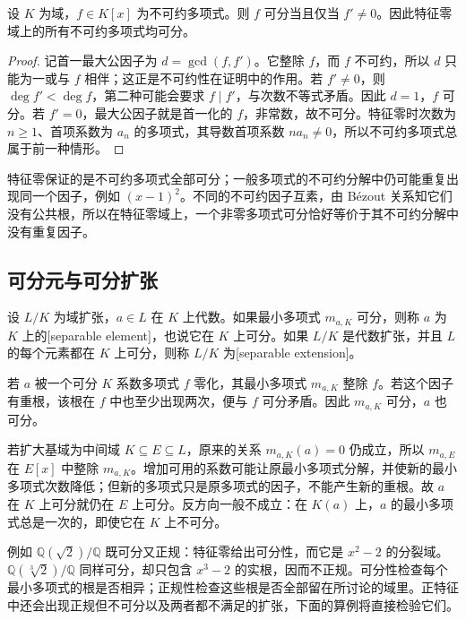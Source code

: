 \begin{proposition}\label{b1:prop:irreducible-separable-derivative}
	设 \(K\) 为域，\(f\in K[x]\) 为不可约多项式。则 \(f\) 可分当且仅当 \(f'\neq0\)。因此特征零域上的所有不可约多项式均可分。
\end{proposition}
\begin{proof}
	记首一最大公因子为 \(d=\gcd(f,f')\)。它整除 \(f\)，而 \(f\) 不可约，所以 \(d\) 只能为一或与 \(f\) 相伴；这正是不可约性在证明中的作用。若 \(f'\neq0\)，则 \(\deg f'<\deg f\)，第二种可能会要求 \(f\mid f'\)，与次数不等式矛盾。因此 \(d=1\)，\(f\) 可分。若 \(f'=0\)，最大公因子就是首一化的 \(f\)，非常数，故不可分。特征零时次数为 \(n\geq1\)、首项系数为 \(a_n\) 的多项式，其导数首项系数 \(na_n\neq0\)，所以不可约多项式总属于前一种情形。
\end{proof}
特征零保证的是不可约多项式全部可分；一般多项式的不可约分解中仍可能重复出现同一个因子，例如 \((x-1)^2\)。不同的不可约因子互素，由 Bézout 关系知它们没有公共根，所以在特征零域上，一个非零多项式可分恰好等价于其不可约分解中没有重复因子。

\subsection{可分元与可分扩张}
\label{b1:subsec:1601:02}

\begin{definition}\label{b1:def:separable-extension}
	设 \(L/K\) 为域扩张，\(a\in L\) 在 \(K\) 上代数。如果最小多项式 \(m_{a,K}\) 可分，则称 \(a\) 为 \(K\) 上的[separable element]，也说它在 \(K\) 上可分。如果 \(L/K\) 是代数扩张，并且 \(L\) 的每个元素都在 \(K\) 上可分，则称 \(L/K\) 为[separable extension]。
\end{definition}
若 \(a\) 被一个可分 \(K\) 系数多项式 \(f\) 零化，其最小多项式 \(m_{a,K}\) 整除 \(f\)。若这个因子有重根，该根在 \(f\) 中也至少出现两次，便与 \(f\) 可分矛盾。因此 \(m_{a,K}\) 可分，\(a\) 也可分。

\ProseParagraphBreak
若扩大基域为中间域 \(K\subseteq E\subseteq L\)，原来的关系 \(m_{a,K}(a)=0\) 仍成立，所以 \(m_{a,E}\) 在 \(E[x]\) 中整除 \(m_{a,K}\)。增加可用的系数可能让原最小多项式分解，并使新的最小多项式次数降低；但新的多项式只是原多项式的因子，不能产生新的重根。故 \(a\) 在 \(K\) 上可分就仍在 \(E\) 上可分。反方向一般不成立：在 \(K(a)\) 上，\(a\) 的最小多项式总是一次的，即使它在 \(K\) 上不可分。

\ProseParagraphBreak
例如 \(\mathbb Q(\sqrt2)/\mathbb Q\) 既可分又正规：特征零给出可分性，而它是 \(x^2-2\) 的分裂域。\(\mathbb Q(\sqrt[3]2)/\mathbb Q\) 同样可分，却只包含 \(x^3-2\) 的实根，因而不正规。可分性检查每个最小多项式的根是否相异；正规性检查这些根是否全部留在所讨论的域里。正特征中还会出现正规但不可分以及两者都不满足的扩张，下面的算例将直接检验它们。

